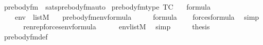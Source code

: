 \begin{isabellebody}
\isamarkupfalse%
%
\endisatagproof
{\isafoldproof}%
%
\isadelimproof
\isanewline
%
\endisadelimproof
\isanewline
%
\isadelimML
\isanewline
%
\endisadelimML
%
\isatagML
{}\isamarkupfalse%
\ {\isachardoublequoteopen}prebody{\isacharunderscore}{\kern0pt}fm{\isachardoublequoteclose}\ \ sats{\isacharunderscore}{\kern0pt}prebody{\isacharunderscore}{\kern0pt}fm{\isacharunderscore}{\kern0pt}auto%
\endisatagML
{\isafoldML}%
%
\isadelimML
\isanewline
%
\endisadelimML
\isanewline
{}\isamarkupfalse%
\ prebody{\isacharunderscore}{\kern0pt}fm{\isacharunderscore}{\kern0pt}type\ {\isacharbrackleft}{\kern0pt}TC{\isacharbrackright}{\kern0pt}{\isacharcolon}{\kern0pt}\isanewline
\ \ \ {\isachardoublequoteopen}{\isasymphi}{\isasymin}formula{\isachardoublequoteclose}\isanewline
\ \ \ \ {\isachardoublequoteopen}env\ {\isasymin}\ list{\isacharparenleft}{\kern0pt}M{\isacharparenright}{\kern0pt}{\isachardoublequoteclose}\isanewline
\ \ \ {\isachardoublequoteopen}prebody{\isacharunderscore}{\kern0pt}fm{\isacharparenleft}{\kern0pt}{\isasymphi}{\isacharcomma}{\kern0pt}env{\isacharparenright}{\kern0pt}{\isasymin}formula{\isachardoublequoteclose}\isanewline
%
\isadelimproof
%
\endisadelimproof
%
\isatagproof
{}\isamarkupfalse%
\ {\isacharminus}{\kern0pt}\isanewline
\ \ \isamarkupfalse%
\ {\isacartoucheopen}{\isasymphi}{\isasymin}formula{\isacartoucheclose}\isanewline
\ \ \isamarkupfalse%
\ {\isachardoublequoteopen}forces{\isacharparenleft}{\kern0pt}{\isasymphi}{\isacharparenright}{\kern0pt}{\isasymin}formula{\isachardoublequoteclose}\ \isamarkupfalse%
\ simp\isanewline
\ \ \isamarkupfalse%
\isanewline
\ \ \isamarkupfalse%
\ {\isachardoublequoteopen}renrep{\isacharparenleft}{\kern0pt}forces{\isacharparenleft}{\kern0pt}{\isasymphi}{\isacharparenright}{\kern0pt}{\isacharcomma}{\kern0pt}env{\isacharparenright}{\kern0pt}{\isasymin}formula{\isachardoublequoteclose}\isanewline
\ \ \ \ \isamarkupfalse%
\ {\isacartoucheopen}env{\isasymin}list{\isacharparenleft}{\kern0pt}M{\isacharparenright}{\kern0pt}{\isacartoucheclose}\ \isamarkupfalse%
\ simp\isanewline
\ \ \isamarkupfalse%
\ \isamarkupfalse%
\ {\isacharquery}{\kern0pt}thesis\ \isamarkupfalse%
\ prebody{\isacharunderscore}{\kern0pt}fm{\isacharunderscore}{\kern0pt}def\ \isamarkupfalse%

\end{isabellebody}
